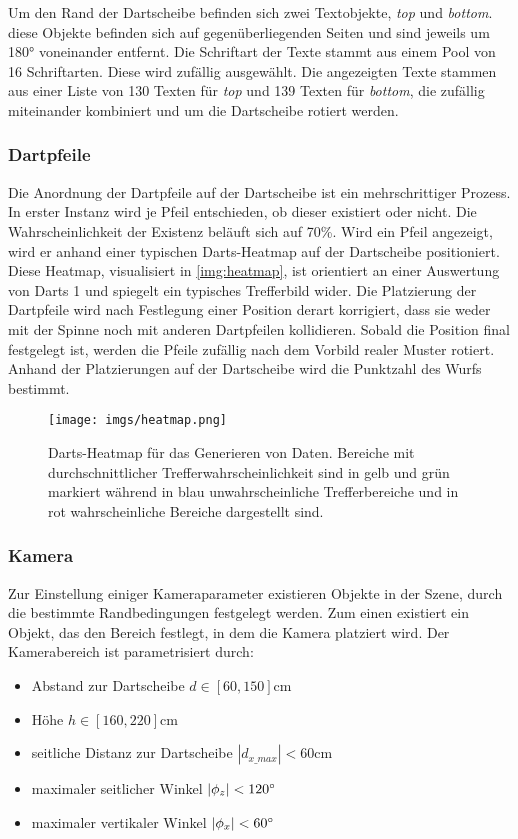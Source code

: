 Um den Rand der Dartscheibe befinden sich zwei Textobjekte, \textit{top} und \textit{bottom}. diese Objekte befinden sich auf gegenüberliegenden Seiten und sind jeweils um 180° voneinander entfernt. Die Schriftart der Texte stammt aus einem Pool von 16 Schriftarten. Diese wird zufällig ausgewählt. Die angezeigten Texte stammen aus einer Liste von 130 Texten für \textit{top} und 139 Texten für \textit{bottom}, die zufällig miteinander kombiniert und um die Dartscheibe rotiert werden.

\subsubsection{Dartpfeile}
\label{sec:impl:daten:python:pfeile}

Die Anordnung der Dartpfeile auf der Dartscheibe ist ein mehrschrittiger Prozess. In erster Instanz wird je Pfeil entschieden, ob dieser existiert oder nicht. Die Wahrscheinlichkeit der Existenz beläuft sich auf 70\%. Wird ein Pfeil angezeigt, wird er anhand einer typischen Darts-Heatmap auf der Dartscheibe positioniert. Diese Heatmap, visualisiert in \autoref{img:heatmap}, ist orientiert an einer Auswertung von Darts 1 \cite{heatmap} und spiegelt ein typisches Trefferbild wider. Die Platzierung der Dartpfeile wird nach Festlegung einer Position derart korrigiert, dass sie weder mit der Spinne noch mit anderen Dartpfeilen kollidieren. Sobald die Position final festgelegt ist, werden die Pfeile zufällig nach dem Vorbild realer Muster rotiert. Anhand der Platzierungen auf der Dartscheibe wird die Punktzahl des Wurfs bestimmt.

\begin{figure}
    \centering
    \texttt{[image: imgs/heatmap.png]}
    \caption{Darts-Heatmap für das Generieren von Daten. Bereiche mit durchschnittlicher Trefferwahrscheinlichkeit sind in gelb und grün markiert während in blau unwahrscheinliche Trefferbereiche und in rot wahrscheinliche Bereiche dargestellt sind.}
    \label{img:heatmap}
\end{figure}

\subsubsection{Kamera}
\label{sec:impl:daten:python:kamera}

Zur Einstellung einiger Kameraparameter existieren Objekte in der Szene, durch die bestimmte Randbedingungen festgelegt werden. Zum einen existiert ein Objekt, das den Bereich festlegt, in dem die Kamera platziert wird. Der Kamerabereich ist parametrisiert durch:
\begin{itemize}
    \item Abstand zur Dartscheibe $d \in [60, 150]\text{cm}$
    \item Höhe $h \in [160, 220]\text{cm}$
    \item seitliche Distanz zur Dartscheibe $|d_{x\_max}| < 60\text{cm}$
    \item maximaler seitlicher Winkel $|\phi_z| < 120^{\circ}$
    \item maximaler vertikaler Winkel $|\phi_x| < 60^{\circ}$
\end{itemize}

